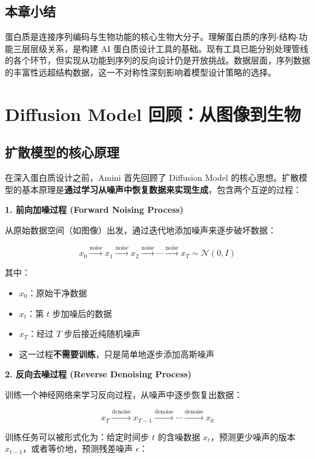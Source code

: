\documentclass[a4paper]{article}
\begin{document}
\subsection{本章小结}

蛋白质是连接序列编码与生物功能的核心生物大分子。理解蛋白质的序列-结构-功能三层层级关系，是构建 AI 蛋白质设计工具的基础。现有工具已能分别处理管线的各个环节，但实现从功能到序列的反向设计仍是开放挑战。数据层面，序列数据的丰富性远超结构数据，这一不对称性深刻影响着模型设计策略的选择。


\section{Diffusion Model 回顾：从图像到生物}

\subsection{扩散模型的核心原理}

在深入蛋白质设计之前，Amini 首先回顾了 Diffusion Model 的核心思想。扩散模型的基本原理是\textbf{通过学习从噪声中恢复数据来实现生成}，包含两个互逆的过程：

\textbf{1. 前向加噪过程 (Forward Noising Process)}

从原始数据空间（如图像）出发，通过迭代地添加噪声来逐步破坏数据：

$$x_0 \xrightarrow{\text{noise}} x_1 \xrightarrow{\text{noise}} x_2 \xrightarrow{\text{noise}} \cdots \xrightarrow{\text{noise}} x_T \sim \mathcal{N}(0, I)$$

其中：
\begin{itemize}
    \item $x_0$：原始干净数据
    \item $x_t$：第 $t$ 步加噪后的数据
    \item $x_T$：经过 $T$ 步后接近纯随机噪声
    \item 这一过程\textbf{不需要训练}，只是简单地逐步添加高斯噪声
\end{itemize}

\textbf{2. 反向去噪过程 (Reverse Denoising Process)}

训练一个神经网络来学习反向过程，从噪声中逐步恢复出数据：

$$x_T \xrightarrow{\text{denoise}} x_{T-1} \xrightarrow{\text{denoise}} \cdots \xrightarrow{\text{denoise}} x_0$$

训练任务可以被形式化为：给定时间步 $t$ 的含噪数据 $x_t$，预测更少噪声的版本 $x_{t-1}$，或者等价地，预测残差噪声 $\epsilon$：
\end{document}
